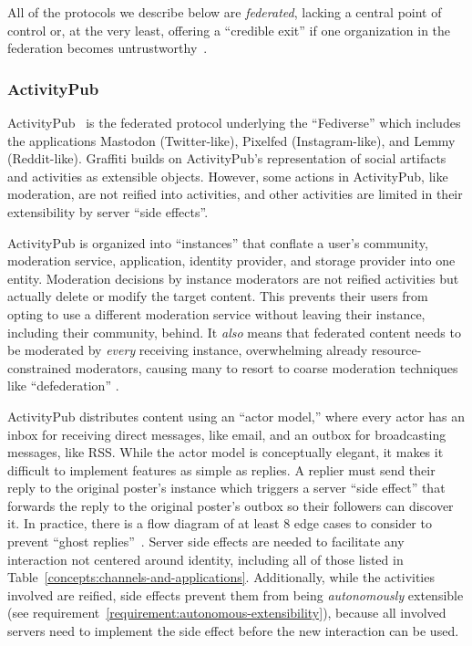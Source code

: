 All of the protocols we describe below are \emph{federated},
lacking a central point of control or,
at the very least, offering
a ``credible exit'' if one organization in the federation becomes
untrustworthy~\cite{howdecentralizedisbluesky}.

\subsubsection{ActivityPub}

ActivityPub~\cite{activitypub} is the federated protocol underlying the
``Fediverse'' which includes the applications
Mastodon (Twitter-like), Pixelfed (Instagram-like), and
Lemmy (Reddit-like).
Graffiti builds on ActivityPub's representation of social artifacts and
activities as extensible objects.
However, some actions in ActivityPub, like moderation, are not
reified into activities, and other activities are
limited in their extensibility by server ``side effects''.

ActivityPub is organized into ``instances'' that conflate
a user's community, moderation service, application,
identity provider, and storage provider into one entity.
Moderation decisions by instance moderators are not reified activities
but actually delete or modify the target content.
This prevents their users from opting to use a different moderation
service without leaving their instance, including their community,
behind.
It \emph{also} means that federated content
needs to be moderated by \emph{every} receiving instance,
overwhelming already resource-constrained moderators, causing many
to resort to coarse moderation techniques like ``defederation''
\cite{securingfederatedplatforms}.

ActivityPub distributes content using an ``actor model,''
where every actor has an inbox for receiving direct messages, like email,
and an outbox for broadcasting messages, like RSS.
While the actor model is conceptually elegant, it makes it difficult
to implement features as simple as replies.
A replier must send their reply to the original poster's instance which
triggers a server ``side effect'' that forwards the reply to the original
poster's outbox so their followers can discover it.
In practice, there is a flow diagram of at least 8 edge cases to consider
to prevent ``ghost replies''~\cite{stateofmastodon}.
Server side effects are needed to facilitate any interaction not centered around identity,
including all of those listed in Table~\ref{concepts:channels-and-applications}.
Additionally, while the activities involved are reified, side effects prevent them
from being \emph{autonomously} extensible (see requirement~\ref{requirement:autonomous-extensibility}),
because all involved servers need to implement the side effect before
the new interaction can be used.

